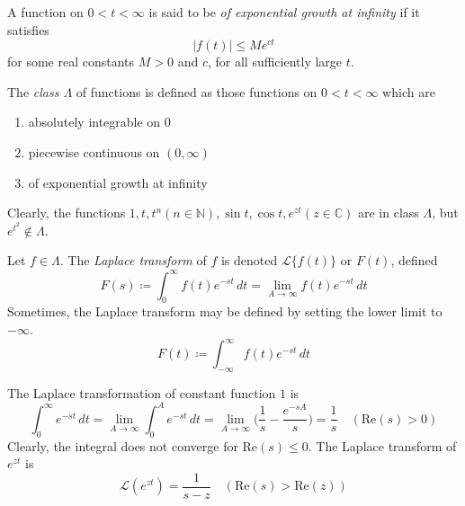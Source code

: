 \documentclass{article}
\newcounter{definition}[section]
\newcounter{example}[section]
\begin{document}
  \begin{definition}
    \label{def:functions-of-exponential-growth-at-infinity}
  A function on $0 < t < \infty$ is said to be \textit{of exponential growth at infinity} if it satisfies
  \begin{equation}
    |f(t)| \leq M e^{ct}
  \end{equation}
  for some real constants $M>0$ and $c$, for all sufficiently large $t$. 
  \end{definition}

  \begin{definition}
    \label{def:function-class-lambda}
  The \textit{class $\Lambda$} of functions is defined as those functions on $0<t<\infty$ which are
  \begin{enumerate}
      \item absolutely integrable on $0$ 
      \item piecewise continuous on $(0, \infty)$
      \item of exponential growth at infinity
  \end{enumerate}
  Clearly, the functions $1, t, t^n (n \in \mathbb{N}), \sin{t}, \cos{t}, e^{zt} (z \in \mathbb{C})$ are in class $\Lambda$, but $e^{t^2} \not\in \Lambda$. 
  \end{definition}

  \begin{definition}
    \label{def:laplace-transform}
  Let $f \in \Lambda$. The \textit{Laplace transform} of $f$ is denoted $\mathcal{L}\{f(t)\}$ or $F(t)$, defined
  \begin{equation}
    F(s) \coloneqq \int_0^\infty f(t)e^{-s t} \, dt = \lim_{A \rightarrow \infty} f(t) e^{-st}\,dt
  \end{equation}
  Sometimes, the Laplace transform may be defined by setting the lower limit to $- \infty$. 
  \begin{equation}
    F(t) \coloneqq \int_{-\infty}^\infty f(t) e^{-s t}\,dt
  \end{equation}
  \end{definition}

  \begin{example}
    \label{ex:laplace-transform-of-the-constant-function}
  The Laplace transformation of constant function $1$ is 
  \begin{equation}
    \int_0^\infty e^{-st}\,dt = \lim_{A \rightarrow \infty} \int_0^A e^{-st} \,dt = \lim_{A \rightarrow \infty} \bigg( \frac{1}{s} - \frac{e^{-sA}}{s} \bigg) = \frac{1}{s}\quad (\text{Re}(s) > 0)
  \end{equation}
  Clearly, the integral does not converge for Re$(s) \leq 0$. The Laplace transform of $e^{zt}$ is
  \begin{equation}
    \mathcal{L} (e^{zt}) = \frac{1}{s-z} \quad (\text{Re}(s)> \text{Re}(z))
  \end{equation}
  \end{example}
\end{document}
